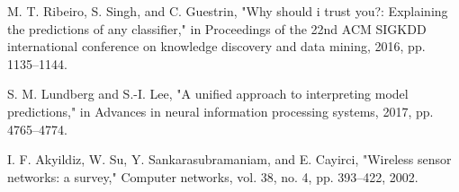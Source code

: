 \documentclass[conference]{IEEEtran}
\begin{document}
\begin{thebibliography}{99}
M. T. Ribeiro, S. Singh, and C. Guestrin, "Why should i trust you?: Explaining the predictions of any classifier," in Proceedings of the 22nd ACM SIGKDD international conference on knowledge discovery and data mining, 2016, pp. 1135--1144.

S. M. Lundberg and S.-I. Lee, "A unified approach to interpreting model predictions," in Advances in neural information processing systems, 2017, pp. 4765--4774.

I. F. Akyildiz, W. Su, Y. Sankarasubramaniam, and E. Cayirci, "Wireless sensor networks: a survey," Computer networks, vol. 38, no. 4, pp. 393--422, 2002.

\end{thebibliography}
\end{document}
